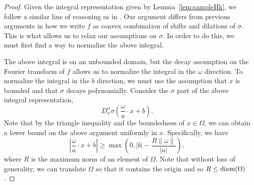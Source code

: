 \begin{proof}
Given the integral representation given by Lemma~\ref{lem:sampleHk}, we follow
a similar line of reasoning as in \cite{barron1993universal}. Our
argument differs from previous arguments in how we write $f$ as convex
combination of shifts and dilations of $\sigma$. This is what allows
us to relax our assumptions on $\sigma$. In order to do this, we must
first find a way to normalize the above integral.
 
 The above integral is on an unbounded domain, but the decay
 assumption on the Fourier transform of $f$ allows us to normalize the
 integral in the $\omega$ direction.  To normalize the integral in the
 $b$ direction, we must use the assumption that $x$ is bounded and
 that $\sigma$ decays polynomially. Consider the $\sigma$ part of the
 above integral representation,
 \begin{equation}
  D_x^\alpha\sigma\left(\frac{\omega}{a}\cdot x+b\right).
 \end{equation}
 Note that by the triangle inequality and the boundedness of $x\in
 \Omega$, we can obtain a lower bound on the above argument uniformly
 in $x$. Specifically, we have
 \begin{equation}
  \left|\frac{\omega}{a}\cdot x+b\right| \geq \max\left(0,|b| - \frac{R\|\omega\|}{|a|}\right),
 \end{equation}
 where $R$ is the maximum norm of an element of $\Omega$. Note that
 without loss of generality, we can translate $\Omega$ so that it
 contains the origin and so $R \leq \text{\normalfont diam}(\Omega)$.
 

\end{proof}
